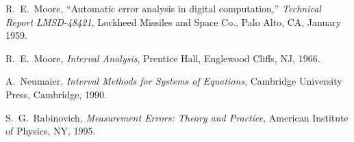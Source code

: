 \begin{thereferences}{99}
R.~E.~Moore,
 ``Automatic error analysis in digital computation,''
 {\it Technical Report LMSD-48421},
 Lockheed Missiles and Space Co., Palo Alto, CA, January 1959.

R.~E.~Moore,
 {\it Interval Analysis},
 Prentice Hall, Englewood Cliffs, NJ, 1966.

A.~Neumaier,
 {\it Interval Methods for Systems of Equations},
 Cambridge University Press, Cambridge, 1990.

S.~G.~Rabinovich,
 {\it Measurement Errors: Theory and Practice},
 American Institute of Physics, NY, 1995.

\end{thereferences}
